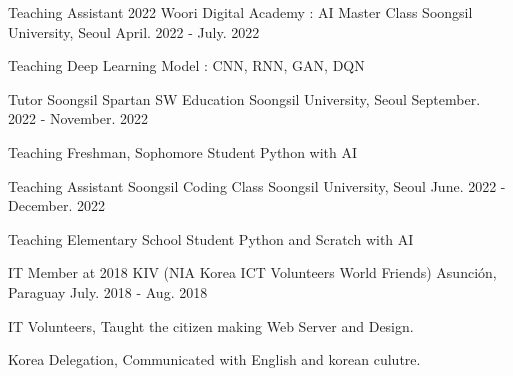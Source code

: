 

\begin{cventries}

  \cventry
    {Teaching Assistant} %
    {2022 Woori Digital Academy : AI Master Class} %
    {Soongsil University, Seoul} %
    {April. 2022 - July. 2022} %
    {
      \begin{cvitems} %
        \item {Teaching Deep Learning Model : CNN, RNN, GAN, DQN}
      \end{cvitems}
    }
    
  \cventry
    {Tutor} %
    {Soongsil Spartan SW Education} %
    {Soongsil University, Seoul} %
    {September. 2022 - November. 2022} %
    {
      \begin{cvitems} %
        \item {Teaching Freshman, Sophomore Student Python with AI}
      \end{cvitems}
    }

  \cventry
    {Teaching Assistant} %
    {Soongsil Coding Class} %
    {Soongsil University, Seoul} %
    {June. 2022 - December. 2022} %
    {
      \begin{cvitems} %
        \item {Teaching Elementary School Student Python and Scratch with AI}
      \end{cvitems}
    }

  \cventry
    {IT Member at 2018} %
    {KIV (NIA Korea ICT Volunteers World Friends)} %
    {Asunción, Paraguay} %
    {July. 2018 - Aug. 2018} %
    {
      \begin{cvitems} %
        \item {IT Volunteers, Taught the citizen making Web Server and Design.}
        \item {Korea Delegation, Communicated with English and korean culutre.}
      \end{cvitems}
    }

\end{cventries}
